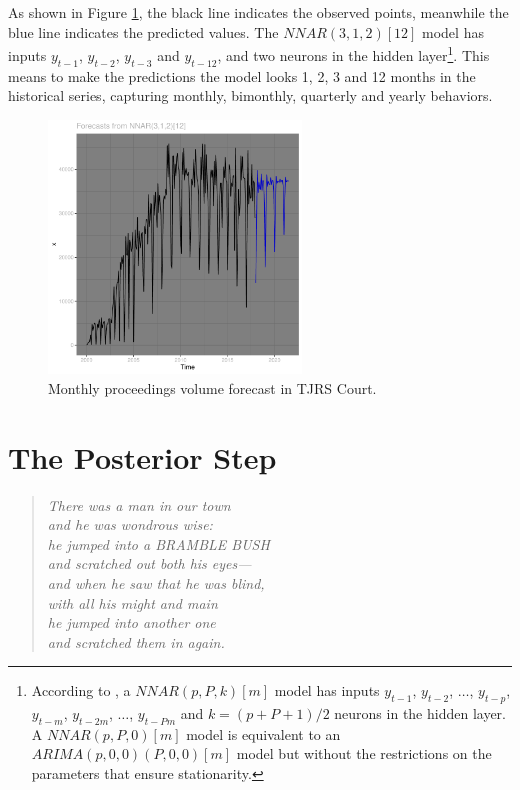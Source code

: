 \documentclass[a4paper]{exam}
\theoremstyle{plain}
\begin{document}
As shown in Figure \ref{fig:pvf}, the black line indicates the observed points, meanwhile the blue line indicates the predicted values. The $NNAR(3,1,2)\left[ 12 \right]$ model has inputs $y_{t-1}$, $y_{t-2}$, $y_{t-3}$ and $y_{t-12}$, and two neurons in the hidden layer\footnote{ According to \cite{hyndman2018forecasting}, a $NNAR(p,P,k)\left[ m \right]$ model has inputs  $y_{t-1}$, $y_{t-2}$, $\ldots$, $y_{t-p}$, $y_{t-m}$, $y_{t-2m}$, $\ldots$, $y_{t-Pm}$ and $k=(p+P+1)/2$ neurons in the hidden layer. A $NNAR(p,P,0) \left[ m \right]$ model is equivalent to an $ARIMA(p,0,0)(P,0,0)\left[ m \right]$ model but without the restrictions on the parameters that ensure stationarity.}. This means to make the predictions the model looks 1, 2, 3 and 12 months in the historical series, capturing monthly, bimonthly, quarterly and yearly behaviors.

\begin{figure}[ht]
\begin{center}
\includegraphics[width=0.6\textwidth]{doj-pvf}
\caption{Monthly proceedings volume forecast in TJRS Court.}
\label{fig:pvf}
\end{center}
\end{figure}
 

\newpage
\section{The Posterior Step}\label{sec:tps}

\begin{quote}
\textit{There was a man in our town \\
and he was wondrous wise: \\
he jumped into a BRAMBLE BUSH \\
and scratched out both his eyes— \\
and when he saw that he was blind, \\
with all his might and main \\
he jumped into another one \\
and scratched them in again.} 
\end{quote}
\end{document}
